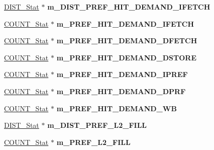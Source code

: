 \begin{DoxyCompactItemize}
\item 
\hypertarget{classall__stats__c_a3104dc6e4f31e91a37182cf960bd1974}{
\hyperlink{classDIST__Stat}{DIST\_\-Stat} $\ast$ {\bfseries m\_\-DIST\_\-PREF\_\-HIT\_\-DEMAND\_\-IFETCH}}
\label{classall__stats__c_a3104dc6e4f31e91a37182cf960bd1974}

\item 
\hypertarget{classall__stats__c_a92a44834802e1c013025b3afbf166fbf}{
\hyperlink{classCOUNT__Stat}{COUNT\_\-Stat} $\ast$ {\bfseries m\_\-PREF\_\-HIT\_\-DEMAND\_\-IFETCH}}
\label{classall__stats__c_a92a44834802e1c013025b3afbf166fbf}

\item 
\hypertarget{classall__stats__c_a8860010b855a8ce06a39bc1666a845fe}{
\hyperlink{classCOUNT__Stat}{COUNT\_\-Stat} $\ast$ {\bfseries m\_\-PREF\_\-HIT\_\-DEMAND\_\-DFETCH}}
\label{classall__stats__c_a8860010b855a8ce06a39bc1666a845fe}

\item 
\hypertarget{classall__stats__c_ae8b6554cee36b918d68e19c42e6c12e7}{
\hyperlink{classCOUNT__Stat}{COUNT\_\-Stat} $\ast$ {\bfseries m\_\-PREF\_\-HIT\_\-DEMAND\_\-DSTORE}}
\label{classall__stats__c_ae8b6554cee36b918d68e19c42e6c12e7}

\item 
\hypertarget{classall__stats__c_ae793588ca5687e6f861393364aa78008}{
\hyperlink{classCOUNT__Stat}{COUNT\_\-Stat} $\ast$ {\bfseries m\_\-PREF\_\-HIT\_\-DEMAND\_\-IPREF}}
\label{classall__stats__c_ae793588ca5687e6f861393364aa78008}

\item 
\hypertarget{classall__stats__c_adbb734a546bbd9823a77506281b66fcd}{
\hyperlink{classCOUNT__Stat}{COUNT\_\-Stat} $\ast$ {\bfseries m\_\-PREF\_\-HIT\_\-DEMAND\_\-DPRF}}
\label{classall__stats__c_adbb734a546bbd9823a77506281b66fcd}

\item 
\hypertarget{classall__stats__c_a15bb052de6419e5450e8236f0a3cbe13}{
\hyperlink{classCOUNT__Stat}{COUNT\_\-Stat} $\ast$ {\bfseries m\_\-PREF\_\-HIT\_\-DEMAND\_\-WB}}
\label{classall__stats__c_a15bb052de6419e5450e8236f0a3cbe13}

\item 
\hypertarget{classall__stats__c_ae6aee0fd87f88ffd2da4f5042ca7b456}{
\hyperlink{classDIST__Stat}{DIST\_\-Stat} $\ast$ {\bfseries m\_\-DIST\_\-PREF\_\-L2\_\-FILL}}
\label{classall__stats__c_ae6aee0fd87f88ffd2da4f5042ca7b456}

\item 
\hypertarget{classall__stats__c_a37f4f1d570e2ba62a16ec52150493517}{
\hyperlink{classCOUNT__Stat}{COUNT\_\-Stat} $\ast$ {\bfseries m\_\-PREF\_\-L2\_\-FILL}}
\label{classall__stats__c_a37f4f1d570e2ba62a16ec52150493517}


\end{DoxyCompactItemize}
